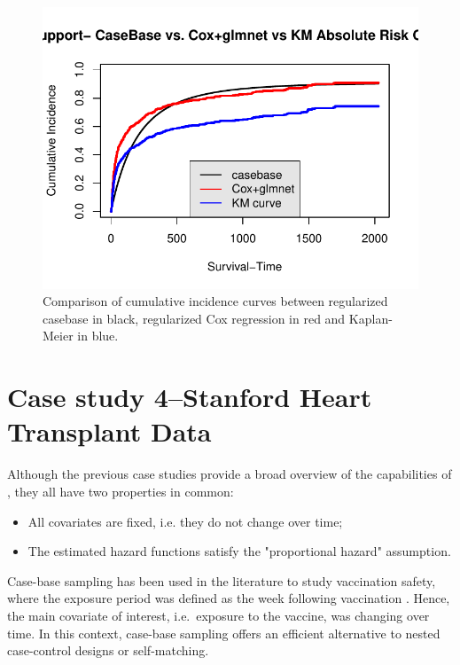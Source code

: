 \documentclass[
]{jss}
\begin{document}
\begin{CodeChunk}
\begin{figure}

{\centering \includegraphics{../figures/abSupportComparison-1} 

}

\caption{\label{fig:abSC} Comparison of cumulative incidence curves between regularized casebase in black, regularized Cox regression in red and Kaplan-Meier in blue.}\label{fig:abSupportComparison}
\end{figure}
\end{CodeChunk}

\hypertarget{case-study-4stanford-heart-transplant-data}{%
\section{Case study 4--Stanford Heart Transplant
Data}\label{case-study-4stanford-heart-transplant-data}}

Although the previous case studies provide a broad overview of the
capabilities of , they all have two properties in common:

\begin{itemize}
  \item All covariates are fixed, i.e. they do not change over time;
  \item The estimated hazard functions satisfy the "proportional hazard" assumption.
\end{itemize}

Case-base sampling has been used in the literature to study vaccination
safety, where the exposure period was defined as the week following
vaccination \citep{saarela2015case}. Hence, the main covariate of
interest, i.e.~exposure to the vaccine, was changing over time. In this
context, case-base sampling offers an efficient alternative to nested
case-control designs or self-matching.
\end{document}

